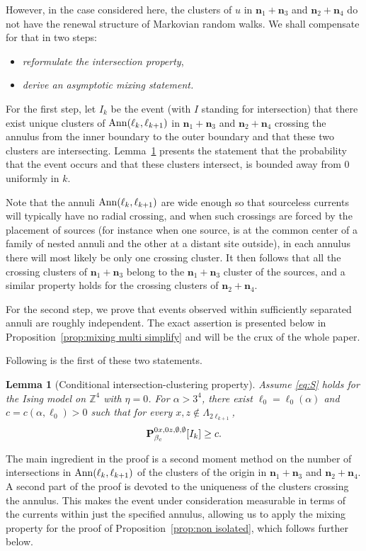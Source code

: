 \documentclass[a4paper,oneside,11pt]{article}
\def\Z{\mathbb{Z}}                          %
\newtheorem{lemma}[theorem]{Lemma}
\newcommand{\be}[1]{\begin{equation}\label{#1}}
\newcommand{\ee}{\end{equation}}
\numberwithin{equation}{section}
\numberwithin{equation}{section}
\numberwithin{equation}{section}
\def\Z{\mathbb{Z}}                          %
\def\be{\begin{equation}}
\def\ee{\end{equation}}
\newcommand{\n}{\mathbf{n}}
\begin{document}
However, in the case considered  here, the clusters 
of $u$ in $\n_1+\n_3$ and $\n_2+\n_4$ do not have the renewal structure of  Markovian random walks.   We shall compensate for that in two steps:
\begin{itemize}[noitemsep,nolistsep]
\item[(i)] \emph{reformulate the intersection property},   
\item[(ii)] \emph{derive an asymptotic mixing statement.}  
\end{itemize}

For the first step, let $I_k$ 
be the event  (with $I$ standing for intersection)  that there exist unique clusters of ${\rm Ann}(\ell_{k},\ell_{k+1})$ in $\n_1+\n_3$ and $\n_2+\n_4$ crossing the annulus from the inner boundary to the outer boundary and that these two clusters are intersecting.   
Lemma~\ref{lem:intersection} presents the statement that   the probability that the event occurs and that these clusters intersect, is bounded away from 0 uniformly in $k$. 
 
 Note that  the annuli ${\rm Ann}(\ell_{k},\ell_{k+1})$ are wide enough so that  sourceless currents will typically have no radial crossing, and when such crossings are forced by the placement of sources (for instance when one source, is at the common center  of a family of nested annuli and the other at a distant site outside), in each annulus there will most likely be only one crossing cluster.   It then follows that all the crossing clusters of $\n_1+\n_3$  belong to the $\n_1+\n_3$ cluster of the sources, and a similar property holds for  the crossing clusters of 
 $\n_2+\n_4$.   
 
For the second step, we prove that 
events observed within sufficiently separated annuli are roughly independent.  The exact assertion  is presented below in  
Proposition~\ref{prop:mixing multi simplify} and will be the crux of the whole paper. 

Following is the first of these two statements. 

\begin{lemma}[Conditional intersection-clustering property]\label{lem:intersection}
Assume \eqref{eq:S} holds for the Ising model on $\Z^4$ with $\eta =0$. For $\alpha>3^4$, there exist $\ell_0=\ell_0(\alpha)$ and $c=c(\alpha,\ell_0)>0$ such that for every $x,z\notin \Lambda_{2\ell_{k+1}}$, 
\be
{\bf P}^{0x,0z,\emptyset,\emptyset}_{\beta_c}[I_k]\ge c.
\ee
\end{lemma}

The main ingredient in the proof is a second moment method on the number of intersections in ${\rm Ann}(\ell_{k},\ell_{k+1})$ of the clusters of the origin in $\n_1+\n_3$ and $\n_2+\n_4$. A second  part of the proof is devoted to the uniqueness of the clusters crossing the annulus.   This  makes the event under consideration measurable in terms of the currents within just the specified annulus, allowing us to apply the mixing property for the proof of Proposition~\ref{prop:non isolated}, which follows further below. 
\end{document}
